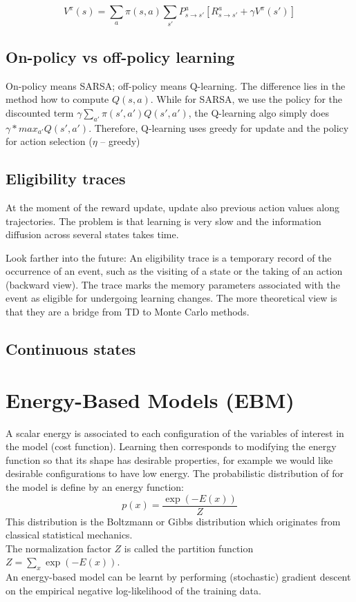 \documentclass[11pt]{article}
\begin{document}
\[
	V^{\pi}(s) = \sum_a \pi(s,a) \sum_{s'} P_{s \rightarrow s'}^a[R_{s \rightarrow s'}^a + \gamma V^{\pi}(s')]
\]

\subsection{On-policy vs off-policy learning}
On-policy means SARSA; off-policy means Q-learning. The difference lies in the method how to compute $Q(s,a)$. While for SARSA, we use the policy for the discounted term $\gamma \sum_{a'} \pi(s',a')Q(s',a')$, the Q-learning algo simply does $\gamma * max_{a'}Q(s',a')$. Therefore, Q-learning uses greedy for update and the policy for action selection ($\eta$ -- greedy)

\subsection{Eligibility traces}
At the moment of the reward update, update also previous action values along trajectories. The problem is that learning is very slow and the information diffusion across several states takes time.

Look farther into the future: An eligibility trace is a temporary record of the occurrence of an event, such as the visiting of a state or the taking of an action (backward view). The trace marks the memory parameters associated with the event as eligible for undergoing learning changes. The more theoretical view is that they are a bridge from TD to Monte Carlo methods.



\subsection{Continuous states}



\section{Energy-Based Models (EBM)}
A scalar energy is associated to each configuration of the variables of interest in the model (cost function). Learning then corresponds to modifying the energy function so that its shape has desirable properties, for example we would like desirable configurations to have low energy. The probabilistic distribution of for the model is define by an energy function:
\[
	p(x)=\frac{\exp(-E(x))}{Z}
\]
This distribution is the Boltzmann or Gibbs distribution which originates from classical statistical mechanics.\\
The normalization factor $Z$ is called the partition function $Z=\sum_x \exp(-E(x))$.\\
An energy-based model can be learnt by performing (stochastic) gradient descent on the empirical negative log-likelihood of the training data.
\end{document}
